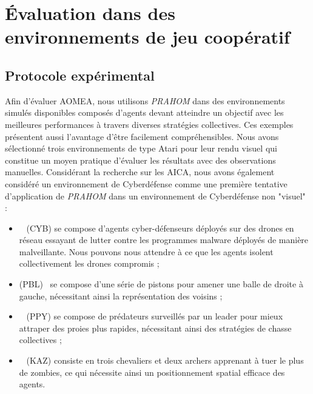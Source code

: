 \documentclass[contribution]{jfsma}
\begin{document}

\section{Évaluation dans des environnements de jeu coopératif}


\subsection{Protocole expérimental}

Afin d'évaluer AOMEA, nous utilisons \emph{PRAHOM} dans des environnements simulés disponibles composés d'agents devant atteindre un objectif avec les meilleures performances à travers diverses stratégies collectives. Ces exemples présentent aussi l'avantage d'être facilement compréhensibles.
Nous avons sélectionné trois environnements de type Atari pour leur rendu visuel qui constitue un moyen pratique d'évaluer les résultats avec des observations manuelles\footnotemark[1].
Considérant la recherche sur les AICA, nous avons également considéré un environnement de Cyberdéfense comme une première tentative d'application de \emph{PRAHOM} dans un environnement de Cyberdéfense non "visuel" :


\begin{itemize}
  \item {}~\cite{cage_challenge_3_announcement} (CYB) se compose d'agents cyber-défenseurs déployés sur des drones en réseau essayant de lutter contre les programmes malware déployés de manière malveillante. Nous pouvons nous attendre à ce que les agents \allowbreak isolent collectivement les drones compromis ;
  \item {} (PBL)~\cite{Terry2021} se compose d'une série de pistons pour amener une balle de droite à gauche, nécessitant ainsi la représentation des voisins ;
  \item {}~\cite{Lowe2017} (PPY) se compose de prédateurs surveillés par un leader pour mieux attraper des proies plus rapides, nécessitant ainsi des stratégies de chasse collectives ;
  \item {}~\cite{Terry2021} (KAZ) consiste en trois chevaliers et deux archers apprenant à tuer le plus de zombies, ce qui nécessite ainsi un positionnement spatial efficace des agents.
\end{itemize}
\end{document}
